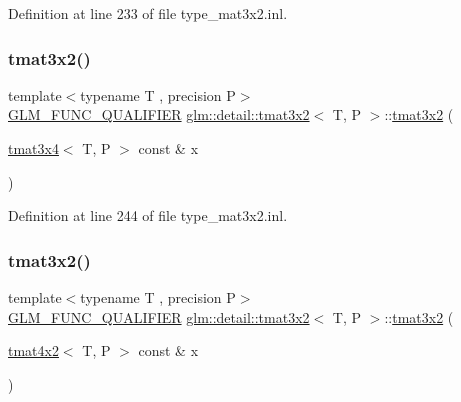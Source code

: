 Definition at line 233 of file type\+\_\+mat3x2.\+inl.

\mbox{\label{structglm_1_1detail_1_1tmat3x2_a9bd5ce0d6f006d0e52867e4aaa847667}} 
\subsubsection{\texorpdfstring{tmat3x2()}{tmat3x2()}\hspace{0.1cm}{\footnotesize\ttfamily [16/22]}}
{\footnotesize\ttfamily template$<$typename T , precision P$>$ \\
\hyperlink{setup_8hpp_a33fdea6f91c5f834105f7415e2a64407}{G\+L\+M\+\_\+\+F\+U\+N\+C\+\_\+\+Q\+U\+A\+L\+I\+F\+I\+ER} \hyperlink{structglm_1_1detail_1_1tmat3x2}{glm\+::detail\+::tmat3x2}$<$ T, P $>$\+::\hyperlink{structglm_1_1detail_1_1tmat3x2}{tmat3x2} (\begin{DoxyParamCaption}\item[{\hyperlink{structglm_1_1detail_1_1tmat3x4}{tmat3x4}$<$ T, P $>$ const \&}]{x }\end{DoxyParamCaption})\hspace{0.3cm}{\ttfamily [explicit]}}



Definition at line 244 of file type\+\_\+mat3x2.\+inl.

\mbox{\label{structglm_1_1detail_1_1tmat3x2_a7c8be95ce9c562abc043a0d97ef38d55}} 
\subsubsection{\texorpdfstring{tmat3x2()}{tmat3x2()}\hspace{0.1cm}{\footnotesize\ttfamily [17/22]}}
{\footnotesize\ttfamily template$<$typename T , precision P$>$ \\
\hyperlink{setup_8hpp_a33fdea6f91c5f834105f7415e2a64407}{G\+L\+M\+\_\+\+F\+U\+N\+C\+\_\+\+Q\+U\+A\+L\+I\+F\+I\+ER} \hyperlink{structglm_1_1detail_1_1tmat3x2}{glm\+::detail\+::tmat3x2}$<$ T, P $>$\+::\hyperlink{structglm_1_1detail_1_1tmat3x2}{tmat3x2} (\begin{DoxyParamCaption}\item[{\hyperlink{structglm_1_1detail_1_1tmat4x2}{tmat4x2}$<$ T, P $>$ const \&}]{x }\end{DoxyParamCaption})\hspace{0.3cm}{\ttfamily [explicit]}}



